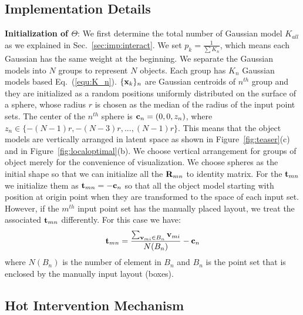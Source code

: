 \subsection{Implementation Details}
%
\textbf{Initialization of $\Theta$}: We first determine the total number of Gaussian model $K_{all}$ as we explained in Sec.~\ref{sec:imp:interact}. 
We set $p_k=\frac{1}{\sum K_n}$, which means each Gaussian has the same weight at the beginning. 
%
We separate the Gaussian models into $N$ groups to represent $N$ objects. 
%
Each group has $K_n$ Gaussian models based Eq.~(\ref{equ:K_n}). $\{\mathbf{x}_k\}_n$ are Gaussian centroids of $n^{th}$ group and they are initialized as a random positions uniformly distributed on the surface of a sphere, whose radius $r$ is chosen as the median of the radius of the input point sets. 
%
The center of the $n^{th}$ sphere is $\mathbf{c}_n=(0,0,z_n)$, where $z_n\in \{-(N-1)r,-(N-3)r,...,(N-1)r\}$.  
%
This means that the object models are vertically arranged in latent space as shown in Figure~\ref{fig:teaser}(c) and in Figure~\ref{fig:localoptimal}(b). 
We choose vertical arrangement for groups of object merely for the convenience of visualization. 
%
We choose spheres as the initial shape so that we can initialize all the $\mathbf{R}_{mn}$ to identity matrix. 
%
For the $\mathbf{t}_{mn}$ we initialize them as $\mathbf{t}_{mn}=- \mathbf{c}_n$ so that all the object model starting with position at origin point when they are transformed to the space of each input set. 
%
However, if the $m^{th}$ input point set has the manually placed layout, we treat the associated $\mathbf{t}_{mn}$ differently. For this case we have:
\begin{equation}
	\label{equ:initt}
	\mathbf{t}_{mn}=\frac{\sum_{\mathbf{v}_{mi} \in B_n}\mathbf{v}_{mi}}{N(B_n)}-\mathbf{c}_n
\end{equation}
where $N(B_n)$ is the number of element in $B_n$ and $B_n$ is the point set that is enclosed by the manually input layout (boxes). 


\subsection{Hot Intervention Mechanism}
%

